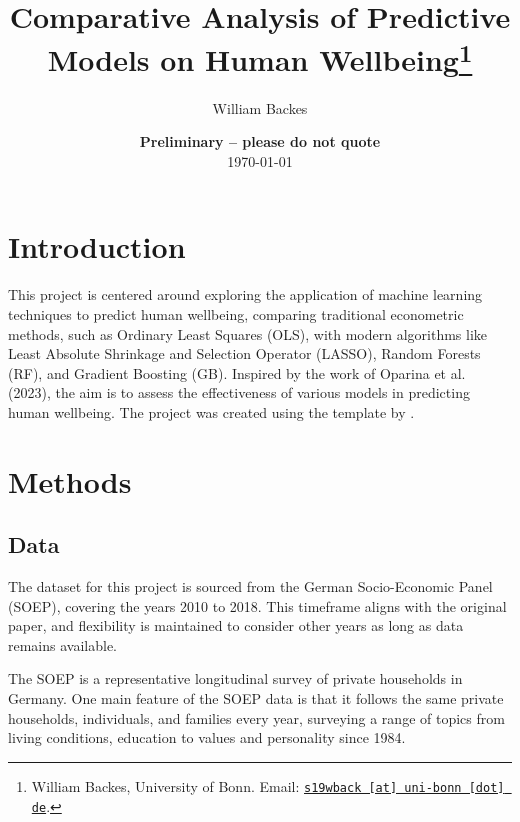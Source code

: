 \documentclass[11pt, a4paper, leqno]{article}
\begin{document}
\title{Comparative Analysis of Predictive Models on Human Wellbeing\thanks{William Backes, University of Bonn. Email: \href{mailto:s19wback@uni-bonn.de}{\nolinkurl{s19wback [at] uni-bonn [dot] de}}.}}

\author{William Backes}

\date{
    {\bf Preliminary -- please do not quote}
    \\[1ex]
    \today
}

\maketitle




\clearpage


\section{Introduction} %
\label{sec:introduction}

This project is centered around exploring the application of machine learning techniques
to predict human wellbeing, comparing traditional econometric methods, such as Ordinary
Least Squares (OLS), with modern algorithms like Least Absolute Shrinkage and Selection
Operator (LASSO), Random Forests (RF), and Gradient Boosting (GB). Inspired by the work
of Oparina et al. (2023), the aim is to assess the effectiveness of various models in
predicting human wellbeing. The project was created using the template by
\citet{GaudeckerEconProjectTemplates}.

\section{Methods} %
\label{sec:methods}

\subsection{Data}
The dataset for this project is sourced from the German Socio-Economic Panel (SOEP),
covering the years 2010 to 2018. This timeframe aligns with the original paper, and
flexibility is maintained to consider other years as long as data remains available.

The SOEP is a representative longitudinal survey of private households in Germany.
One main feature of the SOEP data is that it follows the same private households,
individuals, and families every year, surveying a range of topics from living conditions,
education to values and personality since 1984.
\end{document}
